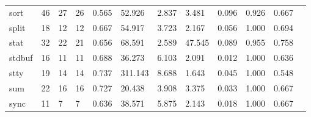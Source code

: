 \begin{longtable}{lp{1.00cm}p{1.00cm}p{1.00cm}p{1.00cm}p{1.00cm}p{1.00cm}p{1.00cm}p{1.00cm}p{1.00cm}p{1.00cm}p{1.00cm}}
sort      &                           46 &                 27 &                                26 &                                      0.565 &                                 52.926 &                                        2.837 &                             3.481 &                                   0.096 &                        0.926 &                                        0.667 \\
split     &                           18 &                 12 &                                12 &                                      0.667 &                                 54.917 &                                        3.723 &                             2.167 &                                   0.056 &                        1.000 &                                        0.694 \\
stat      &                           32 &                 22 &                                21 &                                      0.656 &                                 68.591 &                                        2.589 &                            47.545 &                                   0.089 &                        0.955 &                                        0.758 \\
stdbuf    &                           16 &                 11 &                                11 &                                      0.688 &                                 36.273 &                                        6.103 &                             2.091 &                                   0.012 &                        1.000 &                                        0.636 \\
stty      &                           19 &                 14 &                                14 &                                      0.737 &                                311.143 &                                        8.688 &                             1.643 &                                   0.045 &                        1.000 &                                        0.548 \\
sum       &                           22 &                 16 &                                16 &                                      0.727 &                                 20.438 &                                        3.908 &                             3.375 &                                   0.033 &                        1.000 &                                        0.667 \\
sync      &                           11 &                  7 &                                 7 &                                      0.636 &                                 38.571 &                                        5.875 &                             2.143 &                                   0.018 &                        1.000 &                                        0.667 \\

\end{longtable}
